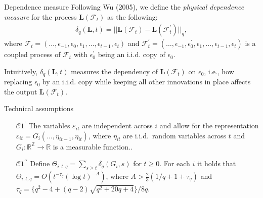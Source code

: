 \documentclass[10pt, handout]{beamer}
\newcommand{\reals}{\mathbb{R}}
\begin{document}
\begin{frame}{Dependence measure}
Following Wu (2005), we define the \textit{physical dependence measure} for the process $\boldsymbol{L}(\mathcal{F}_t)$ as the following:
\begin{align*}
 \delta_q(\boldsymbol{L}, t) = || \boldsymbol{L}(\mathcal{F}_t) - \boldsymbol{L}(\mathcal{F}_t^\prime) ||_q,
\end{align*}
where $\mathcal{F}_t  = (\ldots, \epsilon_{-1}, \epsilon_0, \epsilon_1, \ldots, \epsilon_{t-1}, \epsilon_t)$ and $\mathcal{F}_t^\prime  = (\ldots, \epsilon_{-1}, \epsilon^\prime_0, \epsilon_1, \ldots, \epsilon_{t-1}, \epsilon_t)$ is a coupled process of $\mathcal{F}_t$ with $\epsilon_0^\prime$ being an i.i.d. copy of $\epsilon_0$.\pause

Intuitively, $\delta_q(\boldsymbol{L}, t)$ measures the dependency of $\boldsymbol{L}(\mathcal{F}_t)$ on $\epsilon_0$, i.e., how replacing $\epsilon_0$ by an i.i.d. copy while keeping all other innovations in place affects the output $\boldsymbol{L}(\mathcal{F}_t)$.
\end{frame}

\begin{frame}[label=tech_assumptions]{Technical assumptions}
\begin{enumerate}

\item[$\mathcal{C}1^\prime$] The variables $\varepsilon_{it}$ are independent across $i$ and allow for the representation $\varepsilon_{it} = G_i(\ldots,\eta_{it-1},\eta_{it})$, where $\eta_{it}$ are i.i.d.\ random variables across $t$ and $G_i: \mathbb{R}^\mathbb{Z} \rightarrow \reals$ is a measurable function..

\item[$\mathcal{C}1^{\prime\prime}$]  Define $\Theta_{i, t,q} = \sum\nolimits_{s \ge t} \delta_q(G_i, s)$ for $t \ge 0$. For each $i$ it holds that \linebreak
$\Theta_{i, t,q} = O ( t^{-\tau_q} (\log t)^{-A} )$,  
where $A > \frac{2}{3} (1/q + 1 + \tau_q)$ and \linebreak $\tau_q = \{q^2 - 4 + (q-2) \sqrt{q^2 + 20q + 4}\} / 8q$. \hyperlink{frame_assumptions<3>}{}

\end{enumerate}

\end{frame}
\end{document}
